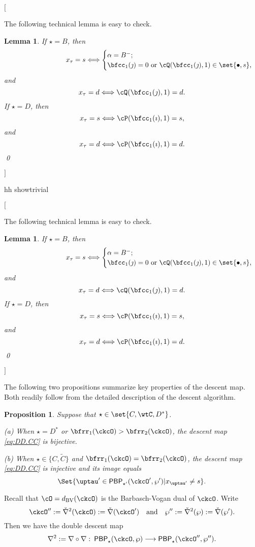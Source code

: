 \documentclass[12pt]{amsart}
\newcommand{\trivial}[2][]{\if\relax\detokenize{#1}\relax
  {%
      \color{orange} \vspace{0em}$[$#2$]$
      \color{black}
  }
  \else
\ifx#1h
\ifcsname showtrivial\endcsname
{%
    \color{orange}\vspace{0em}$[$#2$]$
    \color{black}
}
\fi
\else {\red Wrong argument!} \fi
\fi
}
\def\DD{\nabla}
\numberwithin{equation}{section}
\newtheorem{lem}[thm]{Lemma}
\newtheorem{prop}[thm]{Proposition}
\theoremstyle{remark}
\def\dBV{d_{\mathrm{BV}}}
\def\DD{\nabla}
\def\AND{\quad \text{and} \quad}
\def\PBP{\mathsf{PBP}}
\def\ckcOpp{\ckcO''}
\def\PBPop#1#2#3#4{\PBP_{#1}^{#2}(#3,#4)}
\newcommand{\PBPOP}[1][]{\PBPop{\star}{#1}{\ckcO}{\wp}}
\def\PBPOPp{\PBPop{\star'}{}{\ckcO'}{\wp'}}
\newcommand{\PBPOPpp}[1][]{\PBPop{\star}{#1}{\ckcO''}{\wp''}}
\def\ckDD{{\check\DD}}
\def\DD{\nabla}
\begin{document}
\trivial[h]{

 The following technical lemma is easy to check.

\begin{lem}\label{tailtip}
If $\star=B$, then
\[
\hspace{9em} x_\tau=s\Longleftrightarrow
\begin{cases}
  \alpha=B^-;\\
  \bfcc_1(\jmath)=0 \text{ or }\cQ(\bfcc_{1}(\jmath),1) \in\set{\bullet, s},
  \end{cases}
\]
and
\[
x_\tau=d \Longleftrightarrow
\cQ(\bfcc_{1}(\jmath),1) =d.
\]
If $\star=D$, then
\[
x_\tau=s\Longleftrightarrow \cP(\bfcc_{1}(\imath),1) = s,
\]
and
\[
x_\tau=d\Longleftrightarrow \cP(\bfcc_{1}(\imath),1) =d.
\]
\qed
\end{lem}
}


The following two propositions summarize key properties of the descent map. Both readily follow from the detailed description of the descent algorithm.

\begin{prop} \label{lem:PBPd.C}
  Suppose that  $\star\in \set{C,\wtC, D^*}$.

 \noindent (a) When $\star = D^{*}$ or $\bfrr_1(\ckcO)>\bfrr_2(\ckcO)$,
    the descent map \eqref{eq:DD.CC} is bijective. %

\noindent (b) When $\star\in \{C,\widetilde C\}$ and $\bfrr_1(\ckcO)=\bfrr_2(\ckcO)$,
    the descent map \eqref{eq:DD.CC} is injective and its image equals
    \[
      \Set{\uptau'\in \PBPOPp |  x_{\uptau'}\neq s}.
    \]

\end{prop}
Recall that $\cO = \dBV(\ckcO)$ is the Barbasch-Vogan dual of $\ckcO$.
Write
\[\ckcOpp := \ckDD^2(\ckcO):=\ckDD(\ckcO') \AND \wp'':=\ckDD^2(\wp):= \ckDD(\wp').\]
Then we have the double descent  map
\[
\DD^2:=\DD\circ \DD\, \colon\,  \PBPOP \longrightarrow
    \PBPOPpp.
\]
\end{document}
